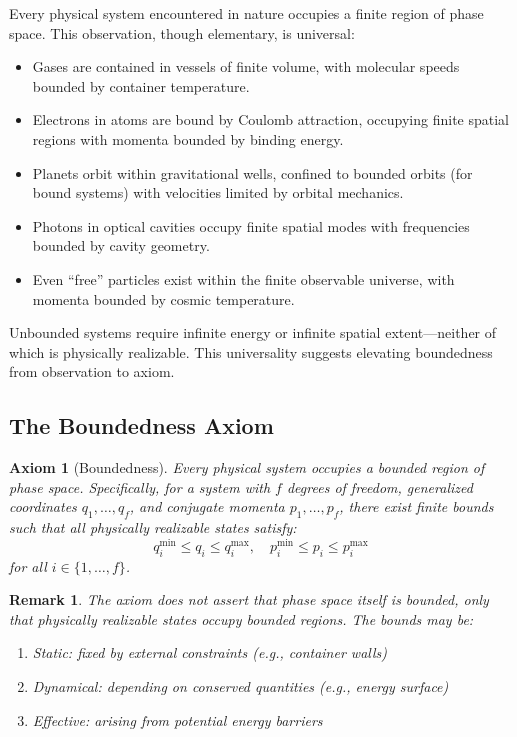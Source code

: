 \documentclass[twocolumn,10pt,twoside]{article}
\newtheorem{remark}[theorem]{Remark}
\newtheorem{axiom}{Axiom}
\begin{document}
Every physical system encountered in nature occupies a finite region of phase space. This observation, though elementary, is universal:

\begin{itemize}
    \item Gases are contained in vessels of finite volume, with molecular speeds bounded by container temperature.
    \item Electrons in atoms are bound by Coulomb attraction, occupying finite spatial regions with momenta bounded by binding energy.
    \item Planets orbit within gravitational wells, confined to bounded orbits (for bound systems) with velocities limited by orbital mechanics.
    \item Photons in optical cavities occupy finite spatial modes with frequencies bounded by cavity geometry.
    \item Even ``free'' particles exist within the finite observable universe, with momenta bounded by cosmic temperature.
\end{itemize}

Unbounded systems require infinite energy or infinite spatial extent---neither of which is physically realizable. This universality suggests elevating boundedness from observation to axiom.

\subsection{The Boundedness Axiom}

\begin{axiom}[Boundedness]
\label{axiom:boundedness}
Every physical system occupies a bounded region of phase space. Specifically, for a system with $f$ degrees of freedom, generalized coordinates $q_1, \ldots, q_f$, and conjugate momenta $p_1, \ldots, p_f$, there exist finite bounds such that all physically realizable states satisfy:
\begin{equation}
q_i^{\min} \leq q_i \leq q_i^{\max}, \quad p_i^{\min} \leq p_i \leq p_i^{\max}
\end{equation}
for all $i \in \{1, \ldots, f\}$.
\end{axiom}

\begin{remark}
The axiom does not assert that phase space itself is bounded, only that physically realizable states occupy bounded regions. The bounds may be:
\begin{enumerate}
    \item \textit{Static}: fixed by external constraints (e.g., container walls)
    \item \textit{Dynamical}: depending on conserved quantities (e.g., energy surface)
    \item \textit{Effective}: arising from potential energy barriers
\end{enumerate}
\end{remark}
\end{document}
